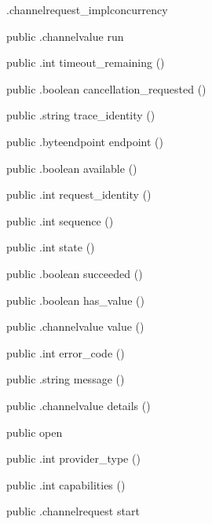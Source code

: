 \begin{CrexxClass}{.channelrequest\_impl}{concurrency}
\begin{Members}
    \Method
      {public}
      {.channelvalue}
      {run}
      {}

    \Method
      {public}
      {.int}
      {timeout\_remaining}
      {()}

    \Method
      {public}
      {.boolean}
      {cancellation\_requested}
      {()}

    \Method
      {public}
      {.string}
      {trace\_identity}
      {()}

    \Method
      {public}
      {.byteendpoint}
      {endpoint}
      {()}

    \Method
      {public}
      {.boolean}
      {available}
      {()}

    \Method
      {public}
      {.int}
      {request\_identity}
      {()}

    \Method
      {public}
      {.int}
      {sequence}
      {()}

    \Method
      {public}
      {.int}
      {state}
      {()}

    \Method
      {public}
      {.boolean}
      {succeeded}
      {()}

    \Method
      {public}
      {.boolean}
      {has\_value}
      {()}

    \Method
      {public}
      {.channelvalue}
      {value}
      {()}

    \Method
      {public}
      {.int}
      {error\_code}
      {()}

    \Method
      {public}
      {.string}
      {message}
      {()}

    \Method
      {public}
      {.channelvalue}
      {details}
      {()}

    \Factory
      {public}
      {open}
      {}

    \Method
      {public}
      {.int}
      {provider\_type}
      {()}

    \Method
      {public}
      {.int}
      {capabilities}
      {()}

    \Method
      {public}
      {.channelrequest}
      {start}
      {}


\end{Members}
\end{CrexxClass}
